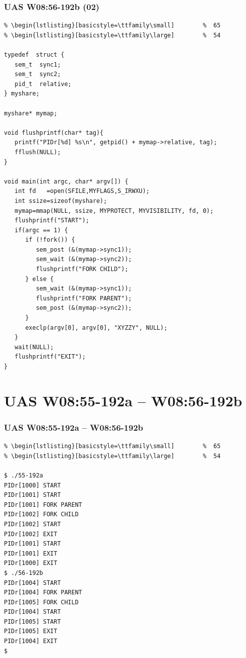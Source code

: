 \documentclass[aspectratio=169, xcolor=table, notheorems, hyperref={pdfpagelabels=false}]{beamer}
\begin{document}
\begin{frame}[fragile]
\frametitle{UAS W08:56-192b (02)}
\begin{lstlisting}[basicstyle=\ttfamily\tiny]         % 108
% \begin{lstlisting}[basicstyle=\ttfamily\footnotesize] %  72
% \begin{lstlisting}[basicstyle=\ttfamily\small]        %  65
% \begin{lstlisting}[basicstyle=\ttfamily\large]        %  54

typedef  struct {
   sem_t  sync1;
   sem_t  sync2;
   pid_t  relative;
} myshare;

myshare* mymap;

void flushprintf(char* tag){
   printf("PIDr[%d] %s\n", getpid() + mymap->relative, tag);
   fflush(NULL);
}

void main(int argc, char* argv[]) {
   int fd   =open(SFILE,MYFLAGS,S_IRWXU);
   int ssize=sizeof(myshare);
   mymap=mmap(NULL, ssize, MYPROTECT, MYVISIBILITY, fd, 0);
   flushprintf("START");
   if(argc == 1) {
      if (!fork()) {
         sem_post (&(mymap->sync1));
         sem_wait (&(mymap->sync2));
         flushprintf("FORK CHILD");
      } else {
         sem_wait (&(mymap->sync1));
         flushprintf("FORK PARENT");
         sem_post (&(mymap->sync2));
      }
      execlp(argv[0], argv[0], "XYZZY", NULL);
   } 
   wait(NULL);
   flushprintf("EXIT");
}

\end{lstlisting}
\end{frame}

\section{UAS W08:55-192a -- W08:56-192b}
\begin{frame}[fragile]
\frametitle{UAS W08:55-192a -- W08:56-192b}
\begin{lstlisting}[basicstyle=\ttfamily\tiny]         % 108
% \begin{lstlisting}[basicstyle=\ttfamily\footnotesize] %  72
% \begin{lstlisting}[basicstyle=\ttfamily\small]        %  65
% \begin{lstlisting}[basicstyle=\ttfamily\large]        %  54

$ ./55-192a 
PIDr[1000] START
PIDr[1001] START
PIDr[1001] FORK PARENT
PIDr[1002] FORK CHILD
PIDr[1002] START
PIDr[1002] EXIT
PIDr[1001] START
PIDr[1001] EXIT
PIDr[1000] EXIT
$ ./56-192b 
PIDr[1004] START
PIDr[1004] FORK PARENT
PIDr[1005] FORK CHILD
PIDr[1004] START
PIDr[1005] START
PIDr[1005] EXIT
PIDr[1004] EXIT
$ 

\end{lstlisting}
\begin{table}
\end{table}
\end{frame}

\end{document}
